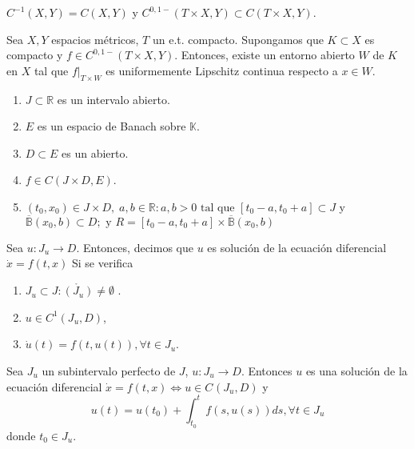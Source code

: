 \begin{obs}
  $C^{-1}(X,Y) = C(X,Y)$ y $C^{0,1-}(T \times X, Y) \subset C(T \times X, Y)$.
\end{obs}

\begin{prop}
  Sea $X,Y$ espacios métricos, $T$ un e.t. compacto. Supongamos que $K \subset X$ es compacto y $f \in C^{0,1-}(T \times X, Y)$. Entonces, existe un entorno abierto $W$ de $K$ en $X$ tal que $f|_{T \times W}$ es uniformemente Lipschitz continua respecto a $x \in W$.
\end{prop}

\begin{nota}
  \begin{enumerate}[label=(\roman*)]
    \item $J \subset \mathbb{R}$ es un intervalo abierto.
    \item $E$ es un espacio de Banach sobre $\mathbb{K}$.
    \item $D \subset E$ es un abierto.
    \item $ f \in C(J \times D, E)$.
    \item $(t_{0}, x_{0}) \in J \times D, \; a, b \in \mathbb{R}: a, b > 0 \text{ tal que } [t_{0} - a, t_{0} + a] \subset J$ y $ \overline{\mathbb{B}}(x_{0}, b) \subset D; \text{ y } R = [t_{0} - a, t_{0} + a] \times \overline{\mathbb{B}}(x_{0}, b)$
  \end{enumerate}
\end{nota}

\begin{defn}
  Sea $u: J_{u} \to D$. Entonces, decimos que $u$ es solución de la ecuación diferencial $\dot{x} = f(t,x)$ Si se verifica
  \begin{enumerate}[label=(\roman*)]
    \item $J_{u} \subset J : \mathring{(J_{u})} \neq \emptyset$ .
    \item $u \in C^{1}(J_{u}, D)$,
    \item $\dot{u}(t) = f(t, u(t)), \forall t \in J_{u}$.
  \end{enumerate}
\end{defn}

\begin{lem}
  Sea $J_{u}$ un subintervalo perfecto de $J$, $u: J_{u} \to D$. Entonces $u$ es una solución de la ecuación diferencial $\dot{x} = f(t,x) \Leftrightarrow u \in C^{}(J_{u}, D)$ y
      \[ 
        u(t) = u(t_{0}) + \int_{t_{0}}^{t} f(s, u(s)) ds, \forall t \in J_{u} 
      \] 
      donde $t_{0} \in J_{u}$.
\end{lem}


